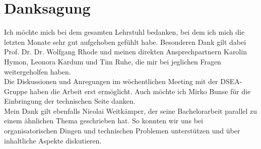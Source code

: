\chapter{Danksagung}
Ich möchte mich bei dem gesamten Lehrstuhl bedanken, bei dem ich mich die letzten Monate sehr gut aufgehoben gefühlt habe.
Besonderen Dank gilt dabei Prof. Dr. Dr. Wolfgang Rhode und meinen direkten Ansprechpartnern Karolin Hymon, Leonora Kardum und Tim Ruhe, die mir bei jeglichen Fragen weitergeholfen haben.
\\
Die Diskussionen und Anregungen im wöchentlichen Meeting mit der DSEA-Gruppe haben die Arbeit erst ermöglicht.
Auch möchte ich Mirko Bunse für die Einbringung der technischen Seite danken.
\\
Mein Dank gilt ebenfalls Nicolai Weitkämper, der seine Bachelorarbeit parallel zu einem ähnlichen Thema geschrieben hat.
So konnten wir uns bei organisatorischen Dingen und technischen Problemen unterstützen und über inhaltliche Aspekte diskutieren.